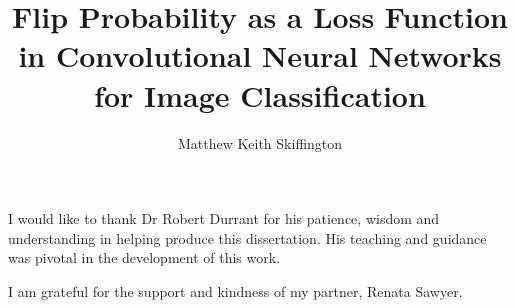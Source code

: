 \documentclass[12pt]{uwthesis17}
\title{Flip Probability as a Loss Function in Convolutional Neural Networks for Image Classification}
\author{Matthew Keith Skiffington}
\begin{document}
\maketitle
\setcounter{page}{2}

\setlength{\parindent}{0pt} %

\begin{abstract}

\end{abstract}
\begin{acknowledgements}

\bigskip

\begin{spacing}{2}


I would like to thank Dr Robert Durrant for his patience, wisdom and understanding in helping produce this dissertation. His teaching and guidance was pivotal in the development of this work.\bigskip

I am grateful for the support and kindness of my partner, Renata Sawyer.\bigskip

\end{spacing}

\end{acknowledgements}
\tableofcontents
\listoffigures
\listoftables
\newpage
{}
\setcounter{page}{1}








\end{document}

